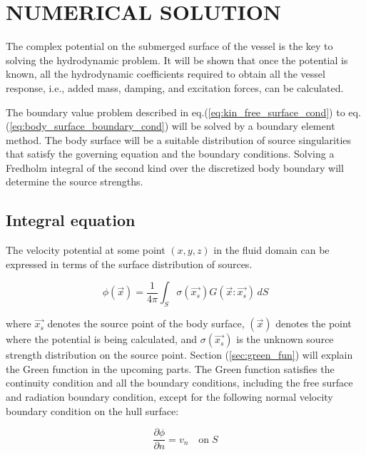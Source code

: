 \chapter{NUMERICAL SOLUTION}
The complex potential on the submerged surface of the vessel is the key to solving the hydrodynamic problem. It will be shown that once the potential is known, all the hydrodynamic coefficients required to obtain all the vessel response, i.e., added mass, damping, and excitation forces, can be calculated.

The boundary value problem described in eq.(\ref{eq:kin_free_surface_cond}) to eq.(\ref{eq:body_surface_boundary_cond})  will be solved by a boundary element method. The body surface will be a suitable distribution of source singularities that satisfy the governing equation and the boundary conditions. Solving a Fredholm integral of the second kind over the discretized body boundary will determine the source strengths. 

\section{Integral equation}
The velocity potential at some point $(x, y, z)$ in the fluid domain can be expressed in terms of the surface distribution of sources.

\begin{equation}
    \label{eq:vel_pot}
    \phi(\vec{x}) = \frac{1}{4\pi}\int_S \sigma(\vec{x_s})G(\vec{x}:\vec{x_s})\,dS
\end{equation}

where $\vec{x_s}$ denotes the source point of the body surface, $(\vec{x})$ denotes the point where the potential is being calculated, and $\sigma(\vec{x_s})$ is the unknown source strength distribution on the source point. Section (\ref{sec:green_fun}) will explain the Green function in the upcoming parts. 
The Green function satisfies the continuity condition and all the boundary conditions, including the free surface and radiation boundary condition, except for the following normal velocity boundary condition on the hull surface:

\begin{equation}
    \label{eq:vel_boundary_cond}
    \frac{\partial \phi}{\partial n} = v_n \quad \text{on}\; S
\end{equation}

